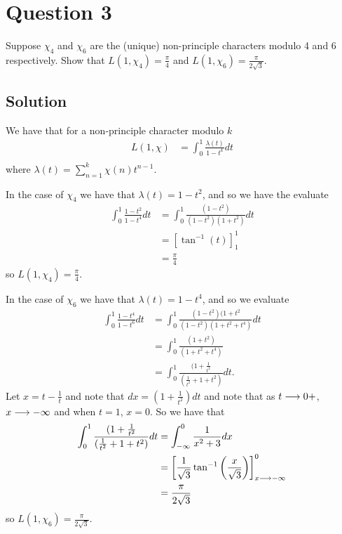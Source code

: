 \documentclass{unswmaths}
\begin{document}
\section*{Question 3}
Suppose $ \chi_4 $ and $ \chi_6 $ are the (unique) non-principle characters modulo 4 and 6 respectively.
Show that $ L(1, \chi_4)  = \frac{\pi}{4} $ and $ L(1, \chi_6) = \frac{\pi}{2\sqrt{3}} $. 

\subsection*{Solution}
We have that for a non-principle character modulo $ k $
\begin{align*}
	L(1, \chi) &= \int_0^1 \frac{\lambda(t)}{1-t^k} dt \\
\end{align*}
where $ \lambda(t) = \sum_{n=1}^k \chi(n)t^{n-1} $.

In the case of $\chi_4 $ we have that 
$ \lambda(t) = 1 - t^2 $,
and so we have the evaluate
\begin{align*}
	\int_0^1 \frac{1-t^2}{1-t^4} dt &= \int_0^1 \frac{(1-t^2)}{(1-t^2)(1+t^2)}dt \\
		&= \left[ \tan^{-1}(t) \right]^1_1 \\
		&= \frac{\pi}{4}
\end{align*}
so $ L(1, \chi_4)  = \frac{\pi}{4} $.

In the case of $ \chi_6 $ we have that $ \lambda(t) = 1 - t^4 $, and so we evaluate
\begin{align*}
	\int_0^1 \frac{1-t^4}{1-t^6} dt &= \int_0^1 \frac{(1-t^2)(1+t^2}{(1-t^2)(1+t^2+t^4)}dt \\
		&= \int_0^1 \frac{(1+t^2)}{(1+t^2+t^4)} \\
		&= \int_0^1 \frac{(1+\frac{1}{t^2}}{(\frac{1}{t^2} + 1 + t^2)} dt.
\end{align*}
Let $ x = t - \frac{1}{t} $ and note that $ dx = (1 + \frac{1}{t^2})dt $
and note that as $ t \longrightarrow 0+ $, $ x \longrightarrow -\infty $ and when $ t = 1 $, $ x = 0 $.
So we have that 
\begin{align*}
	\int_0^1 \frac{(1+\frac{1}{t^2}}{(\frac{1}{t^2} + 1 + t^2)} dt &= \int_{-\infty}^0 \frac{1}{x^2 + 3} dx \\
		&= \left[ \frac{1}{\sqrt{3}}\tan^{-1}\left(\frac{x}{\sqrt{3}}\right)\right]_{x \longrightarrow -\infty}^0 \\
		&= \frac{\pi}{2\sqrt{3}}
\end{align*}
so $ L(1, \chi_6) = \frac{\pi}{2\sqrt{3}} $.
\end{document}
